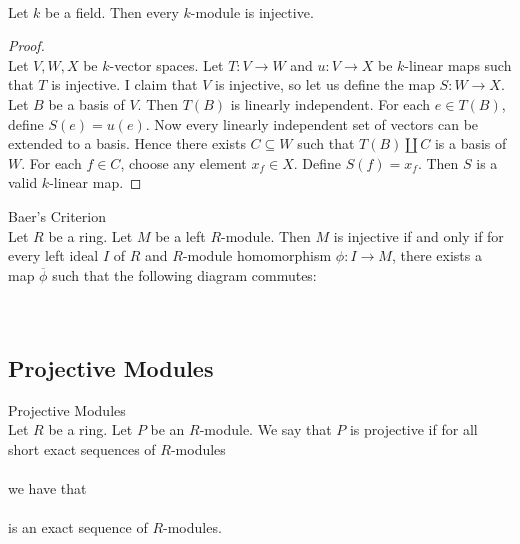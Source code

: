 \documentclass[a4paper]{article}
\begin{document}
\begin{eg}{}{}\\
Let $k$ be a field. Then every $k$-module is injective. 
\begin{proof}\\
Let $V,W,X$ be $k$-vector spaces. Let $T:V\to W$ and $u:V\to X$ be $k$-linear maps such that $T$ is injective. I claim that $V$ is injective, so let us define the map $S:W\to X$. Let $B$ be a basis of $V$. Then $T(B)$ is linearly independent. For each $e\in T(B)$, define $S(e)=u(e)$. Now every linearly independent set of vectors can be extended to a basis. Hence there exists $C\subseteq W$ such that $T(B)\amalg C$ is a basis of $W$. For each $f\in C$, choose any element $x_f\in X$. Define $S(f)=x_f$. Then $S$ is a valid $k$-linear map. 
\end{proof}
\end{eg}

\begin{prp}{Baer's Criterion}{}\\
Let $R$ be a ring. Let $M$ be a left $R$-module. Then $M$ is injective if and only if for every left ideal $I$ of $R$ and $R$-module homomorphism $\phi:I\to M$, there exists a map $\overline{\phi}$ such that the following diagram commutes: \\~\\
 \\
\end{prp}

\subsection{Projective Modules}
\begin{defn}{Projective Modules}{}\\
Let $R$ be a ring. Let $P$ be an $R$-module. We say that $P$ is projective if for all short exact sequences of $R$-modules \\
\\
we have that \\
\\
is an exact sequence of $R$-modules. 
\end{defn}
\end{document}
